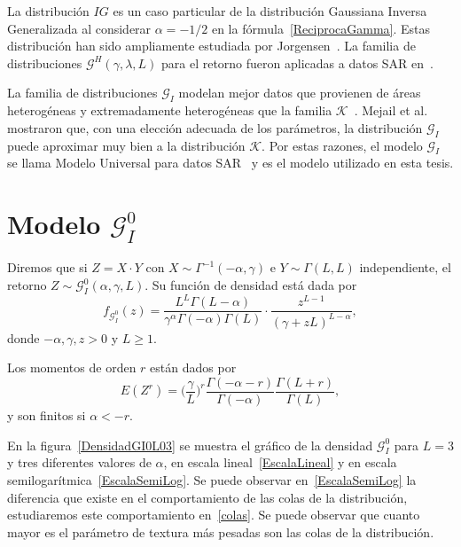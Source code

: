La distribución $IG$ es un caso particular de la distribución Gaussiana Inversa Generalizada al considerar $\alpha=-1/2$ en la fórmula~\ref{ReciprocaGamma}. Estas distribución han sido ampliamente estudiada por Jorgensen~\cite{Jorgensen1982}.  La familia de distribuciones $\mathcal{G}^H(\gamma,\lambda,L)$ para el retorno fueron aplicadas a datos SAR en~\cite{Buemi2009,Jacobo2005}.


La familia de distribuciones $\mathcal{G}_I$ modelan mejor datos que provienen de áreas heterogéneas y extremadamente heterogéneas que la familia $\mathcal{K}$~\cite{Frery97,MejailJacoboFreryBustos:IJRS}. Mejail et al.~\cite{MejailJacoboFreryBustos:IJRS} mostraron que, con una elección adecuada de los parámetros,
la distribución $\mathcal{G}_I$ puede aproximar muy bien a la distribución  $\mathcal{K}$. Por estas razones, el modelo $\mathcal{G}_I$ se llama Modelo Universal para datos SAR~\cite{FreryLibro2019} y es el modelo utilizado en esta tesis.

\section{Modelo $\mathcal{G}_I^0$}
\label{ModeloGI0}

Diremos que si $Z=X \cdot Y$ con $X \sim \Gamma^{-1}(-\alpha,\gamma)$ e $Y \sim \Gamma(L,L)$ independiente, el retorno $Z \sim \mathcal{G}_I^0(\alpha,\gamma,L)$. Su función de densidad está dada por 
\begin{equation}
f_{\mathcal{G}_I^{0}}( z) =\frac{L^{L}\Gamma ( L-\alpha
	) }{\gamma ^{\alpha }\Gamma ( -\alpha ) \Gamma (
	L) }\cdot  
\frac{z^{L-1}}{( \gamma +zL) ^{L-\alpha }},%
\label{ec_dens_gI0}
\end{equation}
donde $-\alpha,\gamma ,z>0$ y $L\geq 1$.

Los momentos de orden $r$ están dados por
\begin{equation}
E(Z^r) =\Big(\frac{\gamma}{L}\Big)^r\frac{\Gamma ( -\alpha-r )}{ \Gamma (-\alpha) }
\frac{\Gamma (L+r )}{\Gamma (L)},
\label{moments_gI0}
\end{equation}
y son finitos si $\alpha<-r$.

En la figura~\ref{DensidadGI0L03} se muestra el gráfico de la densidad $\mathcal{G}_I^0$ para $L=3$ y tres diferentes valores de $\alpha$, en escala lineal~\ref{EscalaLineal} y en escala semilogarítmica~\ref{EscalaSemiLog}. Se puede observar en~\ref{EscalaSemiLog} la diferencia que existe en el comportamiento de las colas de la distribución, estudiaremos este comportamiento en~\ref{colas}. Se puede observar que cuanto mayor es el parámetro de textura más pesadas son las colas de la distribución.

